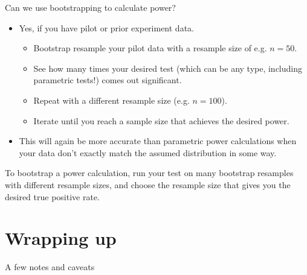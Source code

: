 \documentclass{beamer} %
\begin{document}
\begin{frame}{Can we use bootstrapping to calculate power?}
\begin{itemize}[<+(1)->]
\item Yes, if you have pilot or prior experiment data.
\begin{itemize}
    \item Bootstrap resample your pilot data with a resample size of e.g. $n=50$.
    \item See how many times your desired test (which can be any type, including parametric tests!) comes out significant.
    \item Repeat with a different resample size (e.g. $n=100$). 
    \item Iterate until you reach a sample size that achieves the desired power.
\end{itemize}
\item This will again be more accurate than parametric power calculations when your data don't exactly match the assumed distribution in some way.
\end{itemize}

\end{frame}

\begin{frame}[standout]
To bootstrap a power calculation, run your test on many bootstrap resamples with different resample sizes, and choose the resample size that gives you the desired true positive rate.
\end{frame}


\section{Wrapping up}

\begin{frame}{A few notes and caveats}

\end{frame}
\end{document}
